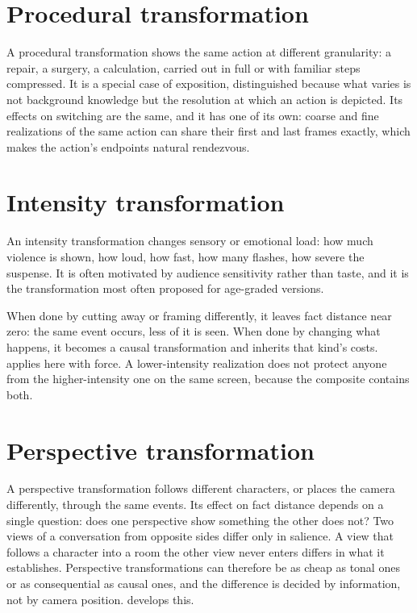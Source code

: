 \section{Procedural transformation}

A procedural transformation shows the same action at different granularity: a repair, a surgery, a calculation, carried out in full or with familiar steps compressed. It is a special case of exposition, distinguished because what varies is not background knowledge but the resolution at which an action is depicted. Its effects on switching are the same, and it has one of its own: coarse and fine realizations of the same action can share their first and last frames exactly, which makes the action's endpoints natural rendezvous.

\section{Intensity transformation}

An intensity transformation changes sensory or emotional load: how much violence is shown, how loud, how fast, how many flashes, how severe the suspense. It is often motivated by audience sensitivity rather than taste, and it is the transformation most often proposed for age-graded versions.

When done by cutting away or framing differently, it leaves fact distance near zero: the same event occurs, less of it is seen. When done by changing what happens, it becomes a causal transformation and inherits that kind's costs.  applies here with force. A lower-intensity realization does not protect anyone from the higher-intensity one on the same screen, because the composite contains both.

\section{Perspective transformation}

A perspective transformation follows different characters, or places the camera differently, through the same events. Its effect on fact distance depends on a single question: does one perspective show something the other does not? Two views of a conversation from opposite sides differ only in salience. A view that follows a character into a room the other view never enters differs in what it establishes. Perspective transformations can therefore be as cheap as tonal ones or as consequential as causal ones, and the difference is decided by information, not by camera position.  develops this.

